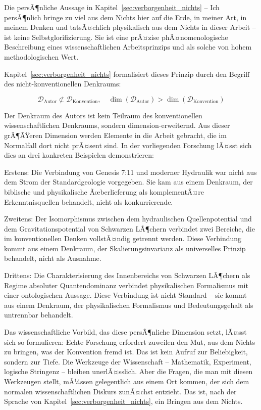 ﻿\documentclass[12pt,a4paper]{report}
\begin{document}
Die persÃ¶nliche Aussage in Kapitel~\ref{sec:verborgenheit_nichts} -- \glqq Ich persÃ¶nlich bringe zu viel aus dem Nichts hier auf die Erde, in meiner Art, in meinem Denken und tatsÃ¤chlich physikalisch aus dem Nichts in dieser Arbeit\grqq{} -- ist keine Selbstglorifizierung. Sie ist eine prÃ¤zise phÃ¤nomenologische Beschreibung eines wissenschaftlichen Arbeitsprinzips und als solche von hohem methodologischen Wert.

Kapitel~\ref{sec:verborgenheit_nichts} formalisiert dieses Prinzip durch den Begriff des nicht-konventionellen Denkraums:

\begin{equation}
	\mathcal{D}_{\text{Autor}} \not\subset \mathcal{D}_{\text{Konvention}}, \quad \dim(\mathcal{D}_{\text{Autor}}) > \dim(\mathcal{D}_{\text{Konvention}})
\end{equation}

Der Denkraum des Autors ist kein Teilraum des konventionellen wissenschaftlichen Denkraums, sondern dimension-erweiternd. Aus dieser grÃ¶ÃŸeren Dimension werden Elemente in die Arbeit gebracht, die im Normalfall dort nicht prÃ¤sent sind. In der vorliegenden Forschung lÃ¤sst sich dies an drei konkreten Beispielen demonstrieren:

Erstens: Die Verbindung von Genesis 7:11 und moderner Hydraulik war nicht aus dem Strom der Standardgeologie vorgegeben. Sie kam aus einem Denkraum, der biblische und physikalische Ãœberlieferung als komplementÃ¤re Erkenntnisquellen behandelt, nicht als konkurrierende.

Zweitens: Der Isomorphismus zwischen dem hydraulischen Quellenpotential und dem Gravitationspotential von Schwarzen LÃ¶chern verbindet zwei Bereiche, die im konventionellen Denken vollstÃ¤ndig getrennt werden. Diese Verbindung kommt aus einem Denkraum, der Skalierungsinvarianz als universelles Prinzip behandelt, nicht als Ausnahme.

Drittens: Die Charakterisierung des Innenbereichs von Schwarzen LÃ¶chern als \glqq Regime absoluter Quantendominanz\grqq{} verbindet physikalischen Formalismus mit einer ontologischen Aussage. Diese Verbindung ist nicht Standard -- sie kommt aus einem Denkraum, der physikalischen Formalismus und Bedeutungsgehalt als untrennbar behandelt.

Das wissenschaftliche Vorbild, das diese persÃ¶nliche Dimension setzt, lÃ¤sst sich so formulieren: Echte Forschung erfordert zuweilen den Mut, aus dem Nichts zu bringen, was der Konvention fremd ist. Das ist kein Aufruf zur Beliebigkeit, sondern zur Tiefe. Die Werkzeuge der Wissenschaft -- Mathematik, Experiment, logische Stringenz -- bleiben unerlÃ¤sslich. Aber die Fragen, die man mit diesen Werkzeugen stellt, mÃ¼ssen gelegentlich aus einem Ort kommen, der sich dem normalen wissenschaftlichen Diskurs zunÃ¤chst entzieht. Das ist, nach der Sprache von Kapitel~\ref{sec:verborgenheit_nichts}, ein Bringen aus dem Nichts.
\end{document}
